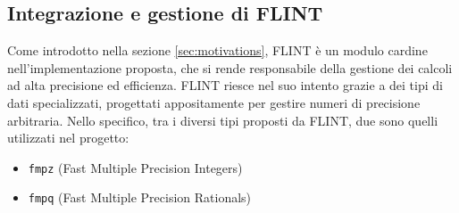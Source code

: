 \subsection{Integrazione e gestione di FLINT}
\label{sec:FLINT}

Come introdotto nella sezione \ref{sec:motivations}, FLINT è un modulo cardine nell'implementazione 
proposta, che si rende responsabile della gestione dei calcoli ad alta precisione ed efficienza. 
FLINT riesce nel suo intento grazie a dei tipi di dati specializzati, 
progettati appositamente per gestire numeri di precisione arbitraria. Nello specifico, 
tra i diversi tipi proposti da FLINT, due sono quelli utilizzati nel progetto:
\begin{itemize}
    \item \texttt{fmpz} (Fast Multiple Precision Integers)
    \item \texttt{fmpq} (Fast Multiple Precision Rationals)
\end{itemize}

